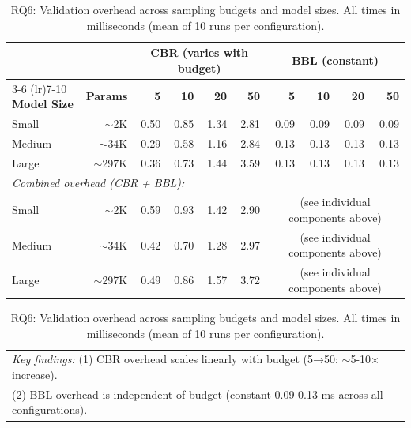 \begin{table}[t]
\centering
\caption{RQ6: Validation overhead across sampling budgets and model sizes. All times in milliseconds (mean of 10 runs per configuration).}
\label{tab:rq6-overhead-full}
\small
\setlength{\tabcolsep}{4pt}
\begin{tabular}{l@{\hspace{6pt}}r@{\hspace{10pt}}rrrr@{\hspace{10pt}}rrrr}
\toprule
& & \multicolumn{4}{c}{\textbf{CBR (varies with budget)}} & \multicolumn{4}{c}{\textbf{BBL (constant)}} \\
\cmidrule(lr){3-6} \cmidrule(lr){7-10}
\textbf{Model Size} & \textbf{Params} & \textbf{5} & \textbf{10} & \textbf{20} & \textbf{50} & \textbf{5} & \textbf{10} & \textbf{20} & \textbf{50} \\
\midrule
Small   & $\sim$2K   & 0.50 & 0.85 & 1.34 & 2.81 & 0.09 & 0.09 & 0.09 & 0.09 \\
Medium  & $\sim$34K  & 0.29 & 0.58 & 1.16 & 2.84 & 0.13 & 0.13 & 0.13 & 0.13 \\
Large   & $\sim$297K & 0.36 & 0.73 & 1.44 & 3.59 & 0.13 & 0.13 & 0.13 & 0.13 \\
\midrule
\multicolumn{10}{l}{\textit{Combined overhead (CBR + BBL):}} \\
Small   & $\sim$2K   & 0.59 & 0.93 & 1.42 & 2.90 & \multicolumn{4}{c}{(see individual components above)} \\
Medium  & $\sim$34K  & 0.42 & 0.70 & 1.28 & 2.97 & \multicolumn{4}{c}{(see individual components above)} \\
Large   & $\sim$297K & 0.49 & 0.86 & 1.57 & 3.72 & \multicolumn{4}{c}{(see individual components above)} \\
\bottomrule
\end{tabular}
\vspace{2mm}
\begin{tabular}{@{}l@{}}
\footnotesize
\textit{Key findings:} (1) CBR overhead scales linearly with budget (5→50: $\sim$5-10× increase). \\
\footnotesize
(2) BBL overhead is independent of budget (constant 0.09-0.13 ms across all configurations).
\end{tabular}
\end{table}
